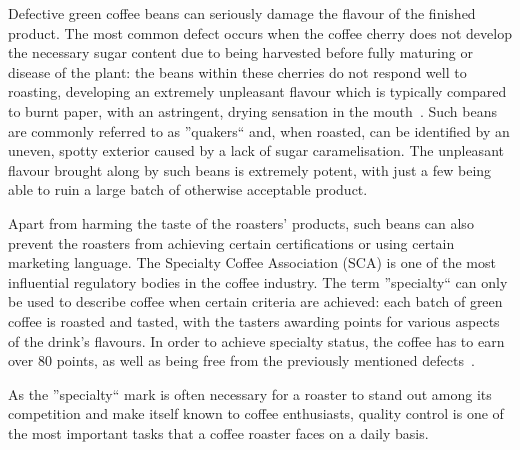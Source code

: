 Defective green coffee beans can seriously damage the flavour of the finished
product.
The most common defect occurs when the coffee cherry does not develop the
necessary sugar content due to being harvested before fully maturing or disease of
the plant: the beans within these cherries do not respond well to roasting, developing
an extremely unpleasant flavour which is typically compared to burnt paper, with
an astringent, drying sensation in the mouth~\cite{colourSorterImg}.
Such beans are commonly referred
to as ''quakers`` and, when roasted, can be identified by an uneven, spotty exterior caused by a lack of sugar caramelisation.
The unpleasant flavour brought along by such beans is extremely potent, with just
a few being able to ruin a large batch of otherwise acceptable product.

Apart from harming the taste of the roasters' products, such beans can also prevent
the roasters from achieving certain certifications or using certain marketing language.
The Specialty Coffee Association (SCA) is one of the most influential regulatory
bodies in the coffee industry.
The term ''specialty`` can only be used to describe
coffee when certain criteria are achieved: each batch of green coffee is roasted
and tasted, with the tasters awarding points for various aspects of the drink's flavours.
In order to achieve specialty status, the coffee has to earn over 80 points, as
well as being free from the previously mentioned defects~\cite{scaCuppingProtocol}.

As the ''specialty`` mark is often necessary for a roaster to stand out among
its competition and make itself known to coffee enthusiasts, quality control is one
of the most important tasks that a coffee roaster faces on a daily basis.

